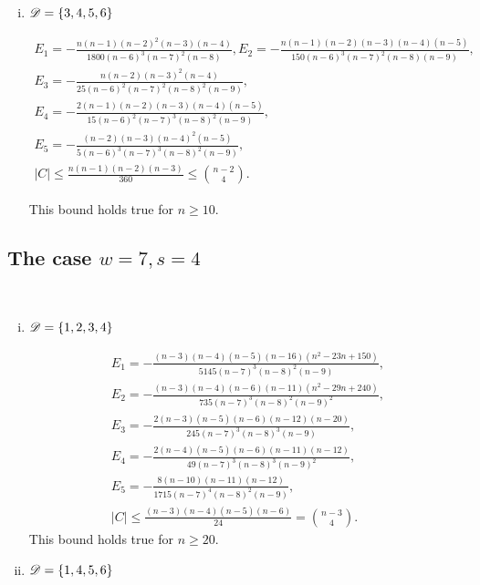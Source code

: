\documentclass{amsart}
\begin{document}
{\begin{enumerate}[(i)]
\item $\mathscr{D}=\{3,4,5,6\}$

\begin{gather*}
E_1=-\frac{n(n-1)(n-2)^2(n-3)(n-4)}{1800(n-6)^3(n-7)^2(n-8)}, E_2=-\frac{n(n-1)(n-2)(n-3)(n-4)(n-5)}{150(n-6)^3(n-7)^2(n-8)(n-9)},\\ 
E_3=-\frac{n(n-2)(n-3)^2(n-4)}{25(n-6)^2(n-7)^2(n-8)^2(n-9)},\\ E_4=-\frac{2(n-1)(n-2)(n-3)(n-4)(n-5)}{15(n-6)^2(n-7)^3(n-8)^2(n-9)},\\
E_5=-\frac{(n-2)(n-3)(n-4)^2(n-5)}{5(n-6)^3(n-7)^3(n-8)^2(n-9)},\\
|C|\le \frac{n(n-1)(n-2)(n-3)}{360} \leq \binom{n-2}{4}.
\end{gather*}

This bound holds true for $n\ge 10.$
\end{enumerate}

\subsection{The case \texorpdfstring{$w=7,s=4$}.}  \label{App:7,4}\hfill\\
\begin{enumerate}[(i)]
\item $\mathscr{D}=\{1,2,3,4\}$

\begin{gather*}
E_1=-\frac{(n-3)(n-4)(n-5)(n-16)\left(n^2-23n+150\right)}{5145(n-7)^3(n-8)^2(n-9)},\\ E_2=-\frac{(n-3)(n-4)(n-6)(n-11)\left(n^2-29n+240\right)}{735(n-7)^3(n-8)^2(n-9)^2},\\ 
E_3=-\frac{2(n-3)(n-5)(n-6)(n-12)(n-20)}{245(n-7)^3(n-8)^3(n-9)},\\
E_4=-\frac{2(n-4)(n-5)(n-6)(n-11)(n-12)}{49(n-7)^3(n-8)^3(n-9)^2},\\
E_5=-\frac{8(n-10)(n-11)(n-12)}{1715(n-7)^4(n-8)^2(n-9)},\\
|C|\le \frac{(n-3)(n-4)(n-5)(n-6)}{24}= \binom{n-3}{4}.
\end{gather*}
This bound holds true for $n\ge 20.$

\item $\mathscr{D}=\{1,4,5,6\}$


\end{enumerate}}
\end{document}
